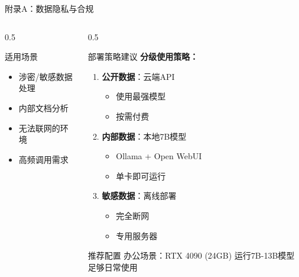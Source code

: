 \documentclass[aspectratio=169,11pt]{beamer}
\begin{document}
\begin{frame}{附录A：数据隐私与合规}
\begin{columns}
\begin{column}{0.5\textwidth}
            \vspace{0.3cm}
            \begin{block}{适用场景}
                \begin{itemize}
                    \item 涉密/敏感数据处理
                    \item 内部文档分析
                    \item 无法联网的环境
                    \item 高频调用需求
                \end{itemize}
            \end{block}
        \end{column}
        \begin{column}{0.5\textwidth}
            \begin{block}{部署策略建议}
                \small
                \textbf{分级使用策略：}
                \begin{enumerate}
                    \item \textbf{公开数据}：云端API
                    \begin{itemize}
                        \tiny
                        \item 使用最强模型
                        \item 按需付费
                    \end{itemize}
                    \item \textbf{内部数据}：本地7B模型
                    \begin{itemize}
                        \tiny
                        \item Ollama + Open WebUI
                        \item 单卡即可运行
                    \end{itemize}
                    \item \textbf{敏感数据}：离线部署
                    \begin{itemize}
                        \tiny
                        \item 完全断网
                        \item 专用服务器
                    \end{itemize}
                \end{enumerate}
            \end{block}
            
            \vspace{0.2cm}
            \begin{exampleblock}{推荐配置}
                \tiny
                办公场景：RTX 4090 (24GB) 运行7B-13B模型足够日常使用
            \end{exampleblock}
        \end{column}
    \end{columns}
\end{frame}
\end{document}
